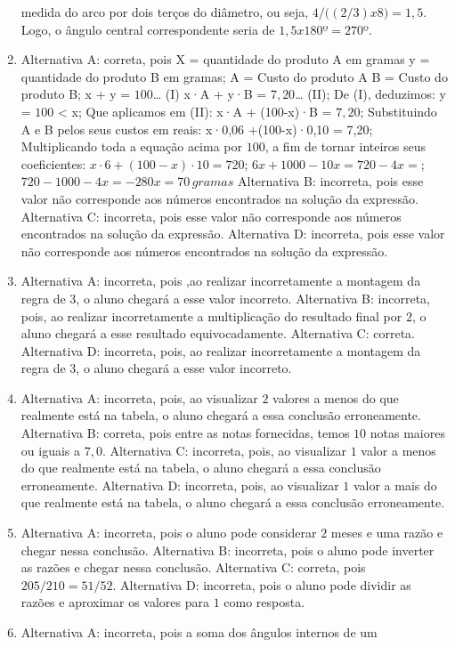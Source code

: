 \begin{enumerate}
medida do arco por dois terços do diâmetro, ou seja, $4/((2/3) x $8$) =
1,5$. Logo, o ângulo central correspondente seria de $1,5 x 180º = 270$º.
\item Alternativa A: correta, pois X = quantidade do produto A em gramas y = quantidade do produto B em
gramas; A = Custo do produto A B = Custo do produto B; x + y = $100$\ldots{} (I) x·A + y·B = $7,20$\ldots{} (II); De (I), deduzimos: y = $100$ \textless{} x; Que aplicamos em (II): x·A + (100-x)·B = $7,20$; Substituindo A e B pelos seus custos em reais: x·0,06 +(100-x)·0,10 = 7,20; Multiplicando toda a equação acima por $100$, a fim de tornar inteiros seus coeficientes: $x·6 + (100-x)·10 = 720$; $6x + 1 000 - 10x = 720 -4x =$; $720 - 1000 -4x = -280 x = 70\,gramas$
Alternativa B: incorreta, pois esse valor não corresponde aos números
encontrados na solução da expressão.
Alternativa C: incorreta, pois esse valor não corresponde aos números
encontrados na solução da expressão.
Alternativa D: incorreta, pois esse valor não corresponde aos números
encontrados na solução da expressão.
\item Alternativa A: incorreta, pois ,ao realizar incorretamente a montagem da
regra de $3$, o aluno chegará a esse valor incorreto.
Alternativa B: incorreta, pois, ao realizar incorretamente a
multiplicação do resultado final por $2$, o aluno chegará a esse resultado
equivocadamente.
Alternativa C: correta.
Alternativa D: incorreta, pois, ao realizar incorretamente a montagem da
regra de $3$, o aluno chegará a esse valor incorreto.
\item Alternativa A: incorreta, pois, ao visualizar $2$ valores a menos do que
realmente está na tabela, o aluno chegará a essa conclusão erroneamente.
Alternativa B: correta, pois entre as notas fornecidas, temos $10$ notas
maiores ou iguais a $7,0$.
Alternativa C: incorreta, pois, ao visualizar $1$ valor a menos do que
realmente está na tabela, o aluno chegará a essa conclusão erroneamente.
Alternativa D: incorreta, pois, ao visualizar $1$ valor a mais do que
realmente está na tabela, o aluno chegará a essa conclusão erroneamente.
\item Alternativa A: incorreta, pois o aluno pode considerar $2$ meses e uma
razão e chegar nessa conclusão.
Alternativa B: incorreta, pois o aluno pode inverter as razões e chegar
nessa conclusão.
Alternativa C: correta, pois $205/210 = 51/52$.
Alternativa D: incorreta, pois o aluno pode dividir as razões e
aproximar os valores para $1$ como resposta.
\item Alternativa A: incorreta, pois a soma dos ângulos internos de um

\end{enumerate}
